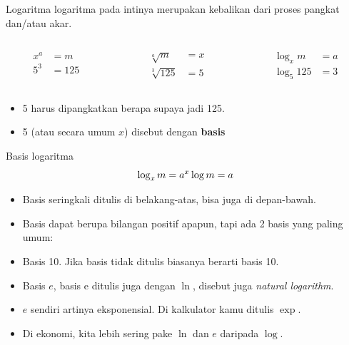 \documentclass[
  ignorenonframetext,
]{beamer}
\begin{document}
\begin{frame}{Logaritma}
\label{logaritma}
logaritma pada intinya merupakan kebalikan dari proses pangkat dan/atau
akar.

\begin{columns}[T]
\begin{column}{0.33\textwidth}
\[
\begin{align*}
x^a &= m \\
5^3 &= 125
\end{align*}
\]
\end{column}

\begin{column}{0.33\textwidth}
\[
\begin{align*}
\sqrt[a]{m} &= x \\
\sqrt[3]{125} &= 5
\end{align*}
\]
\end{column}

\begin{column}{0.33\textwidth}
\[
\begin{align*}
\log_x {m} &= a \\
\log_5 {125} &= 3
\end{align*}
\]
\end{column}
\end{columns}

\begin{itemize}
\item
  5 harus dipangkatkan berapa supaya jadi 125.
\item
  5 (atau secara umum \(x\)) disebut dengan \textbf{basis}
\end{itemize}
\end{frame}

\begin{frame}{Basis logaritma}
\label{basis-logaritma}
\[
\log_x m=a \\
^x \log m=a
\]

\begin{itemize}
\item
  Basis seringkali ditulis di belakang-atas, bisa juga di depan-bawah.
\item
  Basis dapat berupa bilangan positif apapun, tapi ada 2 basis yang
  paling umum:
\item
  Basis 10. Jika basis tidak ditulis biasanya berarti basis 10.
\item
  Basis \(e\), basis e ditulis juga dengan \(\ln\), disebut juga
  \emph{natural logarithm}.
\item
  \(e\) sendiri artinya eksponensial. Di kalkulator kamu ditulis
  \(\exp\).
\item
  Di ekonomi, kita lebih sering pake \(\ln\) dan \(e\) daripada
  \(\log\).
\end{itemize}
\end{frame}
\end{document}
